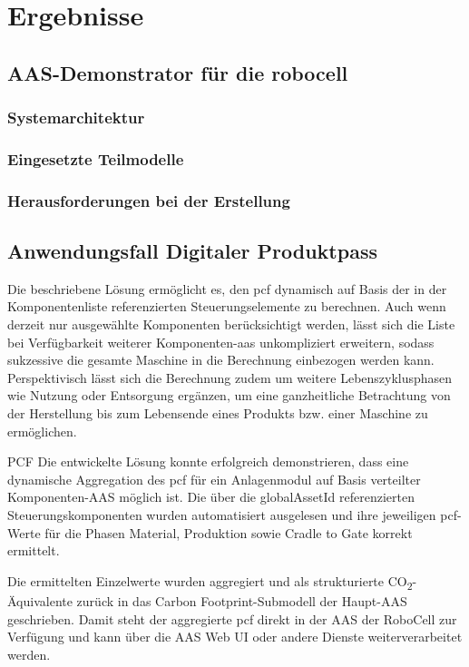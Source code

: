 \section{Ergebnisse}
\subsection{AAS-Demonstrator für die robocell}
\subsubsection{Systemarchitektur}
\subsubsection{Eingesetzte Teilmodelle}
\subsubsection{Herausforderungen bei der Erstellung}
\subsection{Anwendungsfall Digitaler Produktpass}

Die beschriebene Lösung ermöglicht es, den \acs{pcf} dynamisch auf Basis der in der Komponentenliste referenzierten Steuerungselemente zu berechnen. 
Auch wenn derzeit nur ausgewählte Komponenten berücksichtigt werden, lässt sich die Liste bei Verfügbarkeit weiterer Komponenten-\acs{aas} unkompliziert erweitern, sodass sukzessive die gesamte Maschine in die Berechnung einbezogen werden kann. 
Perspektivisch lässt sich die Berechnung zudem um weitere Lebenszyklusphasen wie Nutzung oder Entsorgung ergänzen, um eine ganzheitliche Betrachtung von der Herstellung bis zum Lebensende eines Produkts bzw. einer Maschine zu ermöglichen.


PCF
Die entwickelte Lösung konnte erfolgreich demonstrieren, dass eine dynamische Aggregation des \acs{pcf} für ein Anlagenmodul auf Basis verteilter Komponenten-AAS möglich ist. Die über die globalAssetId referenzierten Steuerungskomponenten wurden automatisiert ausgelesen und ihre jeweiligen \acs{pcf}-Werte für die Phasen Material, Produktion sowie Cradle to Gate korrekt ermittelt.

Die ermittelten Einzelwerte wurden aggregiert und als strukturierte CO\textsubscript{2}-Äquivalente zurück in das Carbon Footprint-Submodell der Haupt-AAS geschrieben. Damit steht der aggregierte \acs{pcf} direkt in der AAS der RoboCell zur Verfügung und kann über die AAS Web UI oder andere Dienste weiterverarbeitet werden.

